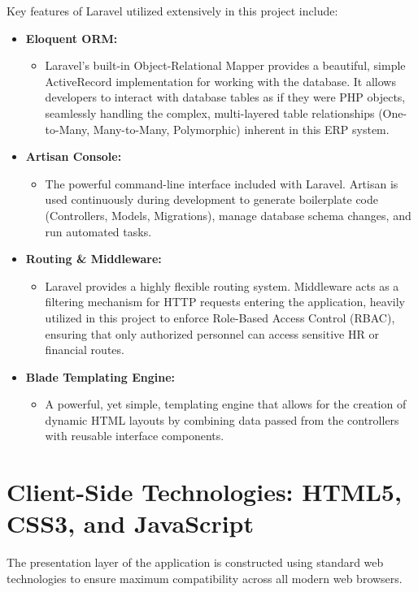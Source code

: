 ﻿\documentclass[12pt,a4paper]{report}
\begin{document}
Key features of Laravel utilized extensively in this project include:
\begin{itemize}
    \item \textbf{Eloquent ORM:}
    \begin{itemize}
        \item Laravel's built-in Object-Relational Mapper provides a beautiful, simple ActiveRecord implementation for working with the database. It allows developers to interact with database tables as if they were PHP objects, seamlessly handling the complex, multi-layered table relationships (One-to-Many, Many-to-Many, Polymorphic) inherent in this ERP system.
    \end{itemize}
    \item \textbf{Artisan Console:}
    \begin{itemize}
        \item The powerful command-line interface included with Laravel. Artisan is used continuously during development to generate boilerplate code (Controllers, Models, Migrations), manage database schema changes, and run automated tasks.
    \end{itemize}
    \item \textbf{Routing \& Middleware:}
    \begin{itemize}
        \item Laravel provides a highly flexible routing system. Middleware acts as a filtering mechanism for HTTP requests entering the application, heavily utilized in this project to enforce Role-Based Access Control (RBAC), ensuring that only authorized personnel can access sensitive HR or financial routes.
    \end{itemize}
    \item \textbf{Blade Templating Engine:}
    \begin{itemize}
        \item A powerful, yet simple, templating engine that allows for the creation of dynamic HTML layouts by combining data passed from the controllers with reusable interface components.
    \end{itemize}
\end{itemize}

\section*{Client-Side Technologies: HTML5, CSS3, and JavaScript}
The presentation layer of the application is constructed using standard web technologies to ensure maximum compatibility across all modern web browsers.
\end{document}
